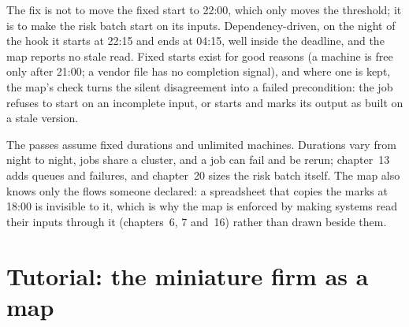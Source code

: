 The fix is not to move the fixed start to 22:00, which only moves the threshold; it is to make the risk batch start on its
inputs. Dependency-driven, on the night of the hook it starts at 22:15 and ends at 04:15, well inside the deadline, and the map
reports no stale read. Fixed starts exist for good reasons (a machine is free only after 21:00; a vendor file has no completion
signal), and where one is kept, the map's check turns the silent disagreement into a failed precondition: the job refuses to
start on an incomplete input, or starts and marks its output as built on a stale version.

\begin{remark}\label{rem:pl:the-platform-map:limits}
The passes assume fixed durations and unlimited machines. Durations vary from night to night, jobs share a cluster, and a job
can fail and be rerun; chapter~13 adds queues and failures, and chapter~20 sizes the risk batch itself. The map also knows only
the flows someone declared: a spreadsheet that copies the marks at 18:00 is invisible to it, which is why the map is enforced by
making systems read their inputs through it (chapters~6, 7 and~16) rather than drawn beside them.
\end{remark}

\section{Tutorial: the miniature firm as a map}\label{tut:pl:the-platform-map:tut}

